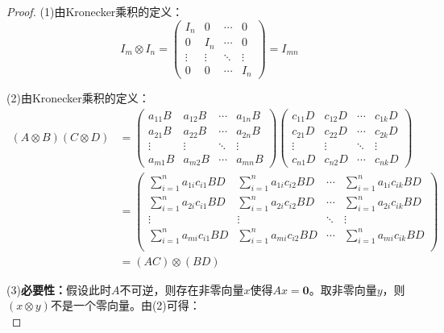 \begin{proof}
	(1)由Kronecker乘积的定义：
	\begin{equation*}
		I_m\otimes I_n
		=
		\begin{pmatrix}
			I_n & 0 & \cdots & 0 \\
			0 & I_n & \cdots & 0 \\
			\vdots & \vdots & \ddots & \vdots \\
			0 & 0 & \cdots & I_n
		\end{pmatrix}=I_{mn}
	\end{equation*}\par
	(2)由Kronecker乘积的定义：
	\begin{align*}
		(A\otimes B)(C\otimes D)
		&=
		\begin{pmatrix}
			a_{11} B & a_{12} B & \cdots & a_{1n} B \\
			a_{21} B & a_{22} B & \cdots & a_{2n} B \\
			\vdots & \vdots & \ddots & \vdots \\
			a_{m1} B & a_{m2} B & \cdots & a_{mn} B
		\end{pmatrix}
		\begin{pmatrix}
			c_{11} D & c_{12} D & \cdots & c_{1k} D \\
			c_{21} D & c_{22} D & \cdots & c_{2k} D \\
			\vdots & \vdots & \ddots & \vdots \\
			c_{n1} D & c_{n2} D & \cdots & c_{nk} D
		\end{pmatrix} \\
		&=
		\begin{pmatrix}
			\sum\limits_{i=1}^{n}a_{1i}c_{i1}BD & \sum\limits_{i=1}^{n}a_{1i}c_{i2}BD & \cdots &\sum\limits_{i=1}^{n}a_{1i}c_{ik}BD \\
			\sum\limits_{i=1}^{n}a_{2i}c_{i1}BD & \sum\limits_{i=1}^{n}a_{2i}c_{i2}BD & \cdots &\sum\limits_{i=1}^{n}a_{2i}c_{ik}BD \\
			\vdots & \vdots & \ddots & \vdots \\
			\sum\limits_{i=1}^{n}a_{mi}c_{i1}BD & \sum\limits_{i=1}^{n}a_{mi}c_{i2}BD & \cdots &\sum\limits_{i=1}^{n}a_{mi}c_{ik}BD \\
		\end{pmatrix} \\
		&=(AC)\otimes (BD)
	\end{align*}\par
	(3)\textbf{必要性：}假设此时$A$不可逆，则存在非零向量$x$使得$Ax=\mathbf{0}$。取非零向量$y$，则$(x\otimes y)$不是一个零向量。由(2)可得：
	\begin{equation*}

\end{equation*}
\end{proof}
